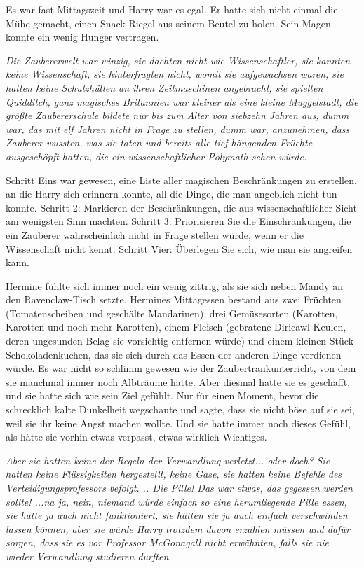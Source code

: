 Es war fast Mittagszeit und Harry war es egal. Er hatte sich nicht einmal die
Mühe gemacht, einen Snack-Riegel aus seinem Beutel zu holen. Sein Magen konnte
ein wenig Hunger vertragen.

\emph{Die Zaubererwelt war winzig, sie dachten nicht wie Wissenschaftler, sie kannten keine Wissenschaft, sie hinterfragten nicht, womit sie aufgewachsen waren, sie hatten keine Schutzhüllen an ihren Zeitmaschinen angebracht, sie spielten Quidditch, ganz magisches Britannien war kleiner als eine kleine Muggelstadt, die größte Zaubererschule bildete nur bis zum Alter von siebzehn Jahren aus, dumm war, das mit elf Jahren nicht in Frage zu stellen, dumm war, anzunehmen, dass Zauberer wussten, was sie taten und bereits alle tief hängenden Früchte ausgeschöpft hatten, die ein wissenschaftlicher Polymath sehen würde.}

Schritt Eins war gewesen, eine Liste aller magischen Beschränkungen zu
erstellen, an die Harry sich erinnern konnte, all die Dinge, die man angeblich
nicht tun konnte. Schritt 2: Markieren der Beschränkungen, die aus
wissenschaftlicher Sicht am wenigsten Sinn machten. Schritt 3: Priorisieren Sie
die Einschränkungen, die ein Zauberer wahrscheinlich nicht in Frage stellen
würde, wenn er die Wissenschaft nicht kennt. Schritt Vier: Überlegen Sie sich,
wie man sie angreifen kann.


Hermine fühlte sich immer noch ein wenig zittrig, als sie sich neben Mandy an
den Ravenclaw-Tisch setzte. Hermines Mittagessen bestand aus zwei Früchten
(Tomatenscheiben und geschälte Mandarinen), drei Gemüsesorten (Karotten,
Karotten und noch mehr Karotten), einem Fleisch (gebratene Diricawl-Keulen,
deren ungesunden Belag sie vorsichtig entfernen würde) und einem kleinen Stück
Schokoladenkuchen, das sie sich durch das Essen der anderen Dinge verdienen
würde. Es war nicht so schlimm gewesen wie der Zaubertrankunterricht, von dem
sie manchmal immer noch Albträume hatte. Aber diesmal hatte sie es geschafft,
und sie hatte sich wie sein Ziel gefühlt. Nur für einen Moment, bevor die
schrecklich kalte Dunkelheit wegschaute und sagte, dass sie nicht böse auf sie
sei, weil sie ihr keine Angst machen wollte. Und sie hatte immer noch dieses
Gefühl, als hätte sie vorhin etwas verpasst, etwas wirklich Wichtiges.

\emph{ Aber sie hatten keine der Regeln der Verwandlung verletzt... oder doch?
Sie hatten keine Flüssigkeiten hergestellt, keine Gase, sie hatten keine Befehle
des Verteidigungsprofessors befolgt. .. Die Pille! Das war etwas, das gegessen
werden sollte! ...na ja, nein, niemand würde einfach so eine herumliegende Pille
essen, sie hatte ja auch nicht funktioniert, sie hätten sie ja auch einfach
verschwinden lassen können, aber sie würde Harry trotzdem davon erzählen müssen
und dafür sorgen, dass sie es vor Professor McGonagall nicht erwähnten, falls
sie nie wieder Verwandlung studieren durften.}


